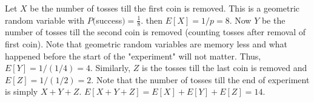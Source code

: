 \documentclass[../../probability-notes.tex]{subfiles}
\begin{document}
Let $X$ be the number of tosses till the first coin is removed. This is a geometric random variable with $P($success$) = \frac{1}{8}$. then $E[X] = 1/p = 8$. Now $Y$ be the number of tosses till the second coin is removed (counting tosses after removal of first coin). Note that geometric random variables are memory less and what happened before the start of the "experiment" will not matter. Thus, $E[Y] = 1/(1/4) = 4$. Similarly, $Z$ is the tosses till the last coin is removed and $E[Z] = 1/(1/2) = 2$. Note that the number of tosses till the end of experiment is simply $X + Y + Z$. $E[X+Y+Z] = E[X] + E[Y] + E[Z] = 14$.
\end{document}
